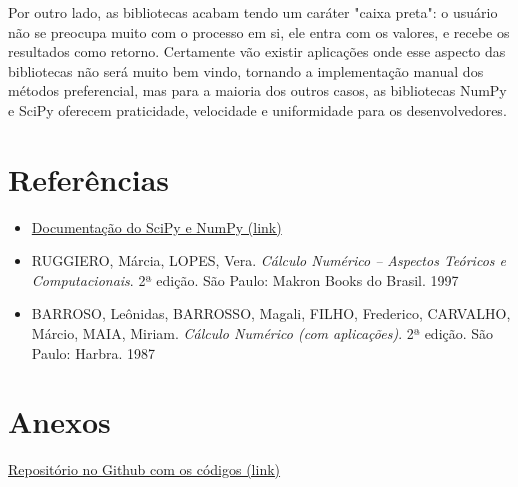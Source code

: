 \documentclass[12pt,A4]{report}
\begin{document}
Por outro lado, as bibliotecas acabam tendo um caráter "caixa preta": o usuário não se preocupa muito com o processo em si, ele entra com os valores, e recebe os resultados como retorno. Certamente vão existir aplicações onde esse aspecto das bibliotecas não será muito bem vindo, tornando a implementação manual dos métodos preferencial, mas para a maioria dos outros casos, as bibliotecas NumPy e SciPy oferecem praticidade, velocidade e uniformidade para os desenvolvedores.

\section{Referências}
\begin{itemize}
    \item \href{https://docs.scipy.org/doc/}{Documentação do SciPy e NumPy (link)}
    \item RUGGIERO, Márcia, LOPES, Vera. \textit{Cálculo Numérico – Aspectos Teóricos e Computacionais}. 2ª edição. São Paulo: Makron Books do Brasil. 1997
    \item BARROSO, Leônidas, BARROSSO, Magali, FILHO, Frederico, CARVALHO, Márcio, MAIA, Miriam. \textit{Cálculo Numérico (com aplicações)}. 2ª edição. São Paulo: Harbra. 1987
\end{itemize}

\section{Anexos}

\href{https://github.com/BastosPedro/metodosnumericos}{Repositório no Github com os códigos (link)}
\end{document}
